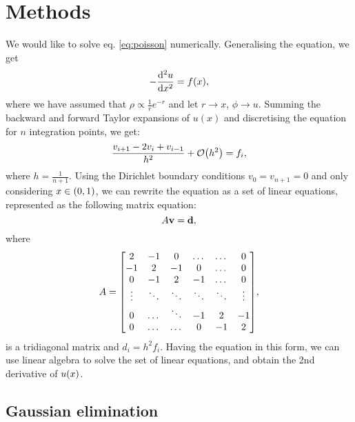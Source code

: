 \section{Methods}
\label{sec:methods}

We would like to solve eq. \ref{eq:poisson} numerically. Generalising the
equation, we get
  \begin{equation}
    -\dv[2]{u}{x} = f\qty(x),
  \end{equation}
where we have assumed that $\rho \propto \frac{1}{r}e^{-r}$ and let $ r
\rightarrow x$, $\phi \rightarrow u$.
Summing the backward and forward Taylor expansions of $u(x)$ and discretising
the equation for $n$ integration points, we get:
  \begin{equation}
  \label{eq:approx}
    \frac{v_{i+1} - 2v_i + v_{i-1}}{h^2} + \order{h^2} = f_i,
  \end{equation}
where $h = \frac{1}{n+1}$. Using the Dirichlet boundary conditions
$v_0 = v_{n+1} = 0$ and only considering $x\in\qty(0, 1)$, we can rewrite the
equation as a set of linear equations, represented as the following matrix
equation:
  \begin{equation}
  \label{eq:matrixeq}
    A\vb{v} = \vb{d},
  \end{equation}
where
  \[A =
    \mqty[2 & -1 & 0 & \dots & \dots & 0 \\
          -1 & 2 & -1 & 0 & \dots & 0 \\
          0 & -1 & 2 & -1 & \dots & 0 \\
          \vdots & \ddots & \ddots & \ddots & \ddots & \vdots \\
          0 & \dots & \ddots & -1 & 2 & -1 \\
          0 & \dots & \dots & 0 & -1 & 2],
  \]
is a tridiagonal matrix and $d_i = h^{2}f_i$.
Having the equation in this form, we can use linear algebra to solve the set of
linear equations, and obtain the 2nd derivative of $u\qty(x)$.


\subsection{Gaussian elimination}
\label{sec:gaussian}

